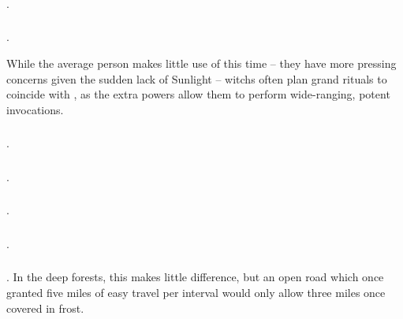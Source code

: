 \begin{multicols}{2}
\subsubsection{}
.

\subsubsection{}
.

While the average person makes little use of this time -- they have more pressing concerns given the sudden lack of Sunlight -- \glspl{witch} often plan grand rituals to coincide with , as the extra powers allow them to perform wide-ranging, potent \glspl{invocation}.

\subsubsection{}
.

\subsubsection{}
.

\subsubsection{}
.

\subsubsection{}
.

\subsubsection{}
.
In the deep forests, this makes little difference, but an open road which once granted five miles of easy travel per \gls{interval} would only allow three miles once covered in frost.


\end{multicols}
